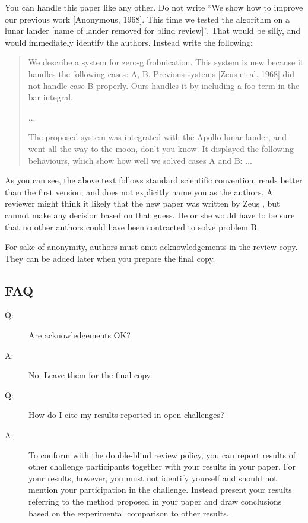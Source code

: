 \documentclass[runningheads]{llncs}
\begin{document}
You can handle this paper like any other.
Do not write ``We show how to improve our previous work [Anonymous, 1968].
This time we tested the algorithm on a lunar lander [name of lander removed for blind review]''.
That would be silly, and would immediately identify the authors.
Instead write the following:
\begin{quotation}
   We describe a system for zero-g frobnication.
   This system is new because it handles the following cases:
   A, B.  Previous systems [Zeus et al. 1968] did not  handle case B properly.
   Ours handles it by including a foo term in the bar integral.

   ...

   The proposed system was integrated with the Apollo lunar lander, and went all the way to the moon, don't you know.
   It displayed the following behaviours, which show how well we solved cases A and B: ...
\end{quotation}
As you can see, the above text follows standard scientific convention, reads better than the first version, and does not explicitly name you as the authors.
A reviewer might think it likely that the new paper was written by Zeus \etal, but cannot make any decision based on that guess.
He or she would have to be sure that no other authors could have been contracted to solve problem B.

For sake of anonymity, authors must omit acknowledgements in the review copy. 
They can be added later when you prepare the final copy.


\subsection*{FAQ}
\begin{description}
  \item[Q:] Are acknowledgements OK?
  \item[A:] No.  Leave them for the final copy.
  \medskip
  \item[Q:] How do I cite my results reported in open challenges?
  \item[A:] To conform with the double-blind review policy, you can report results of other challenge participants together with your results in your paper.
    For your results, however, you must not identify yourself and should not mention your participation in the challenge.
    Instead present your results referring to the method proposed in your paper and draw conclusions based on the experimental comparison to other results.
\end{description}
\end{document}
